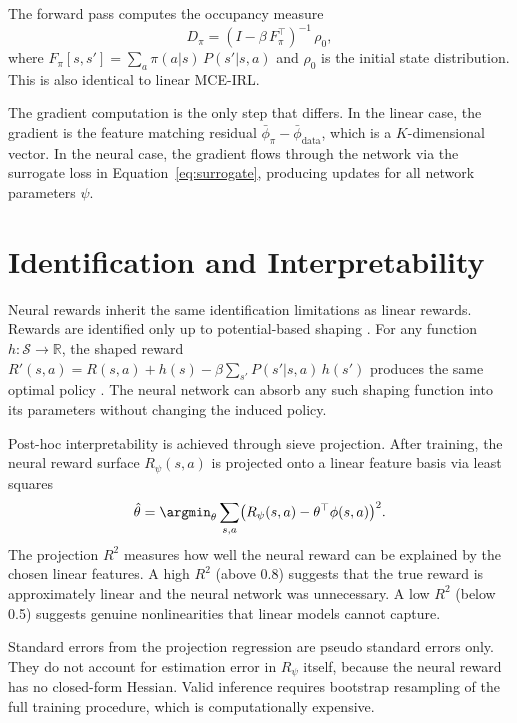 \documentclass[10pt]{article}
\newcommand{\R}{\mathbb{R}}
\newcommand{\calS}{\mathcal{S}}
\begin{document}
The forward pass computes the occupancy measure
\begin{equation}
D_\pi = (I - \beta\, F_\pi^\top)^{-1}\, \rho_0,
\end{equation}
where $F_\pi[s,s'] = \sum_a \pi(a|s)\, P(s'|s,a)$ and $\rho_0$ is the initial state distribution. This is also identical to linear MCE-IRL.

The gradient computation is the only step that differs. In the linear case, the gradient is the feature matching residual $\bar\phi_\pi - \bar\phi_{\text{data}}$, which is a $K$-dimensional vector. In the neural case, the gradient flows through the network via the surrogate loss in Equation~\eqref{eq:surrogate}, producing updates for all network parameters $\psi$.


\section{Identification and Interpretability}

Neural rewards inherit the same identification limitations as linear rewards. Rewards are identified only up to potential-based shaping \citep{ng1999}. For any function $h: \calS \to \R$, the shaped reward $R'(s,a) = R(s,a) + h(s) - \beta \sum_{s'} P(s'|s,a)\, h(s')$ produces the same optimal policy \citep{kim2021}. The neural network can absorb any such shaping function into its parameters without changing the induced policy.

Post-hoc interpretability is achieved through sieve projection. After training, the neural reward surface $R_\psi(s,a)$ is projected onto a linear feature basis via least squares
\begin{equation}
\hat\theta = \argmin_\theta \sum_{s,a} \bigl(R_\psi(s,a) - \theta^\top\phi(s,a)\bigr)^2.
\end{equation}
The projection $R^2$ measures how well the neural reward can be explained by the chosen linear features. A high $R^2$ (above 0.8) suggests that the true reward is approximately linear and the neural network was unnecessary. A low $R^2$ (below 0.5) suggests genuine nonlinearities that linear models cannot capture.

Standard errors from the projection regression are pseudo standard errors only. They do not account for estimation error in $R_\psi$ itself, because the neural reward has no closed-form Hessian. Valid inference requires bootstrap resampling of the full training procedure, which is computationally expensive.
\end{document}
